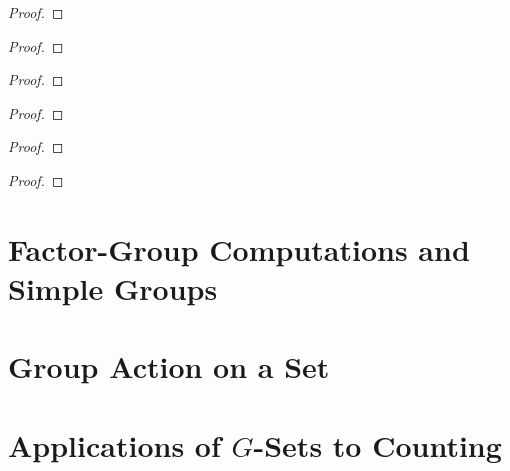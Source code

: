 \begin{proof}
\end{proof}

\begin{exercise}
\end{exercise}

\begin{proof}
\end{proof}

\begin{exercise}
\end{exercise}

\begin{proof}
\end{proof}

\begin{exercise}
\end{exercise}

\begin{proof}
\end{proof}

\begin{exercise}
\end{exercise}

\begin{proof}
\end{proof}

\begin{exercise}
\end{exercise}

\begin{proof}
\end{proof}


\section{Factor-Group Computations and Simple Groups}



\section{Group Action on a Set}



\section{Applications of $G$-Sets to Counting}



